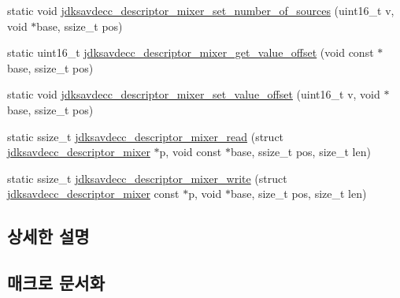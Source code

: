 \begin{DoxyCompactItemize}
\item 
static void \hyperlink{group__descriptor__mixer_gaef4df92f98accfd60cb29831e57f62fe}{jdksavdecc\+\_\+descriptor\+\_\+mixer\+\_\+set\+\_\+number\+\_\+of\+\_\+sources} (uint16\+\_\+t v, void $\ast$base, ssize\+\_\+t pos)
\item 
static uint16\+\_\+t \hyperlink{group__descriptor__mixer_gaa5c0ba55c141e621e25459ae9e779145}{jdksavdecc\+\_\+descriptor\+\_\+mixer\+\_\+get\+\_\+value\+\_\+offset} (void const $\ast$base, ssize\+\_\+t pos)
\item 
static void \hyperlink{group__descriptor__mixer_gab8020717ad4aeeca114e872a16891725}{jdksavdecc\+\_\+descriptor\+\_\+mixer\+\_\+set\+\_\+value\+\_\+offset} (uint16\+\_\+t v, void $\ast$base, ssize\+\_\+t pos)
\item 
static ssize\+\_\+t \hyperlink{group__descriptor__mixer_gab728785314eb0d92b830dc27a1bc35d4}{jdksavdecc\+\_\+descriptor\+\_\+mixer\+\_\+read} (struct \hyperlink{structjdksavdecc__descriptor__mixer}{jdksavdecc\+\_\+descriptor\+\_\+mixer} $\ast$p, void const $\ast$base, ssize\+\_\+t pos, size\+\_\+t len)
\item 
static ssize\+\_\+t \hyperlink{group__descriptor__mixer_ga97d408af61853994b897460787b37473}{jdksavdecc\+\_\+descriptor\+\_\+mixer\+\_\+write} (struct \hyperlink{structjdksavdecc__descriptor__mixer}{jdksavdecc\+\_\+descriptor\+\_\+mixer} const $\ast$p, void $\ast$base, size\+\_\+t pos, size\+\_\+t len)
\end{DoxyCompactItemize}


\subsection{상세한 설명}


\subsection{매크로 문서화}
